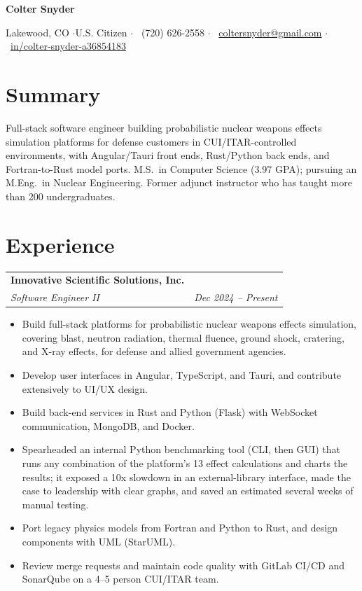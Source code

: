 \documentclass[letterpaper,10pt]{article}
\makeatletter
\newcommand{\entry}[4]{%
  \begin{tabularx}{\linewidth}{@{}X r@{}}
    \textbf{#1} & #2 \\
    \textit{#3} & \textit{\small #4} \\
  \end{tabularx}\vspace{-2pt}%
}
\makeatother
\begin{document}
\begin{center}
  {\Huge\bfseries Colter Snyder}\par\vspace{4pt}
  \small
  Lakewood, CO \enspace$\cdot$\enspace U.S. Citizen \enspace$\cdot$\enspace
  \faPhone*\ (720) 626-2558 \enspace$\cdot$\enspace
  \faEnvelope\ \href{mailto:coltersnyder@gmail.com}{coltersnyder@gmail.com} \enspace$\cdot$\enspace
  \faLinkedin\ \href{https://www.linkedin.com/in/colter-snyder-a36854183/}{in/colter-snyder-a36854183}
\end{center}

\section{Summary}
Full-stack software engineer building probabilistic nuclear weapons effects simulation platforms for
defense customers in CUI/ITAR-controlled environments, with Angular/Tauri front ends, Rust/Python back ends,
and Fortran-to-Rust model ports. M.S.\ in Computer Science (3.97 GPA); pursuing an M.Eng.\ in Nuclear
Engineering. Former adjunct instructor who has taught more than 200 undergraduates.

\section{Experience}

\entry{Innovative Scientific Solutions, Inc.}{}{Software Engineer II}{Dec 2024 -- Present}
\begin{itemize}
  \item Build full-stack platforms for probabilistic nuclear weapons effects simulation, covering
        blast, neutron radiation, thermal fluence,
        ground shock, cratering, and X-ray effects, for defense and allied government agencies.
  \item Develop user interfaces in Angular, TypeScript, and Tauri, and contribute extensively to UI/UX design.
  \item Build back-end services in Rust and Python (Flask) with WebSocket communication, MongoDB, and Docker.
  \item Spearheaded an internal Python benchmarking tool (CLI, then GUI) that runs any combination of the platform's
        13 effect calculations and charts the results; it exposed a 10x slowdown in an external-library interface, made
        the case to leadership with clear graphs, and saved an estimated several weeks of manual testing.
  \item Port legacy physics models from Fortran and Python to Rust, and design components with UML (StarUML).
  \item Review merge requests and maintain code quality with GitLab CI/CD and SonarQube on a 4--5 person CUI/ITAR team.
\end{itemize}
\end{document}
